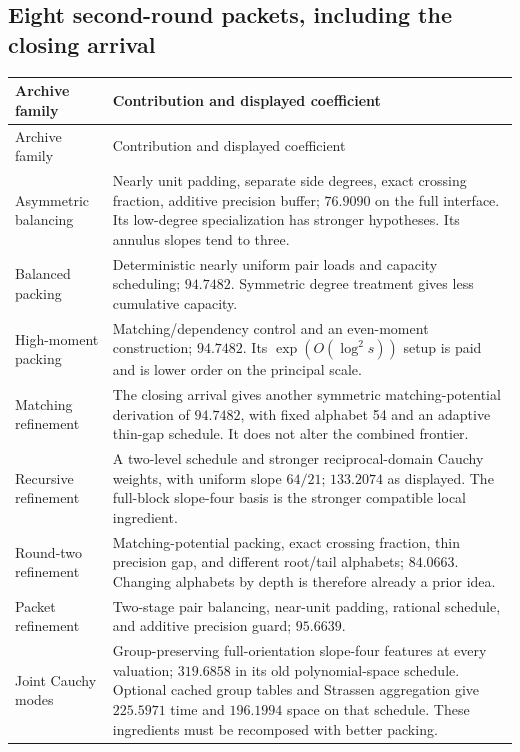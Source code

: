 \documentclass[11pt,letterpaper]{article}
\theoremstyle{remark}\newtheorem{remark}[theorem]{Remark}
\begin{document}
\subsection{Eight second-round packets, including the closing arrival}

\begin{longtable}{@{}>{\raggedright\arraybackslash}p{}>{\raggedright\arraybackslash}p{}@{}}
\toprule Archive family & Contribution and displayed coefficient\\\midrule\endfirsthead
\toprule Archive family & Contribution and displayed coefficient\\\midrule\endhead
Asymmetric balancing \cite{asymmetric} &
Nearly unit padding, separate side degrees, exact crossing fraction,
additive precision buffer; $76.9090$ on the full interface. Its low-degree
specialization has stronger hypotheses. Its annulus slopes tend to three.\\[4pt]
Balanced packing \cite{balanced} &
Deterministic nearly uniform pair loads and capacity scheduling;
$94.7482$. Symmetric degree treatment gives less cumulative capacity.\\[4pt]
High-moment packing \cite{moment} &
Matching/dependency control and an even-moment construction;
$94.7482$. Its $\exp(O(\log^2s))$ setup is paid and is lower order
on the principal scale.\\[4pt]
Matching refinement \cite{matching} &
The closing arrival gives another symmetric matching-potential derivation
of $94.7482$, with fixed alphabet 54 and an adaptive thin-gap schedule.
It does not alter the combined frontier.\\[4pt]
Recursive refinement \cite{recursive} &
A two-level schedule and stronger reciprocal-domain Cauchy weights,
with uniform slope $64/21$; $133.2074$ as displayed. The full-block
slope-four basis is the stronger compatible local ingredient.\\[4pt]
Round-two refinement \cite{roundtwo} &
Matching-potential packing, exact crossing fraction, thin precision gap,
and different root/tail alphabets; $84.0663$. Changing alphabets by depth
is therefore already a prior idea.\\[4pt]
Packet refinement \cite{packet} &
Two-stage pair balancing, near-unit padding, rational schedule, and
additive precision guard; $95.6639$.\\[4pt]
Joint Cauchy modes \cite{joint} &
Group-preserving full-orientation slope-four features at every valuation;
$319.6858$ in its old polynomial-space schedule. Optional cached group
tables and Strassen aggregation give $225.5971$ time and $196.1994$ space
on that schedule. These ingredients must be recomposed with better packing.\\\bottomrule
\end{longtable}
\end{document}
